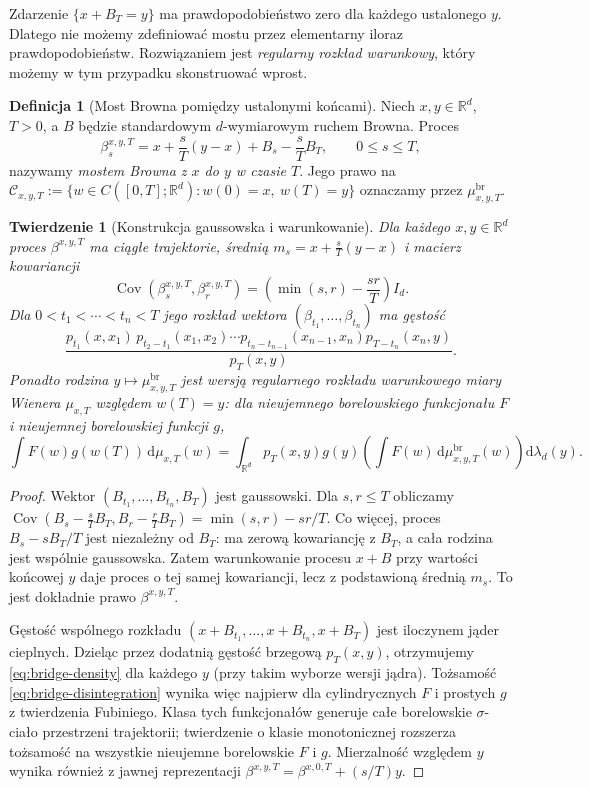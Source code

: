 \documentclass[11pt,a4paper,oneside]{report}
\numberwithin{equation}{chapter}
\theoremstyle{plain}
\newtheorem{twierdzenie}{Twierdzenie}[chapter]
\theoremstyle{definition}
\newtheorem{definicja}{Definicja}[chapter]
\theoremstyle{remark}
\newcommand{\R}{\mathbb{R}}
\newcommand{\calC}{\mathcal{C}}
\newcommand{\dd}{\mathrm{d}}
\begin{document}
Zdarzenie $\{x+B_T=y\}$ ma prawdopodobieństwo zero dla
każdego ustalonego $y$. Dlatego nie możemy zdefiniować mostu
przez elementarny iloraz prawdopodobieństw.
Rozwiązaniem jest \emph{regularny rozkład warunkowy}, który
możemy w tym przypadku skonstruować wprost.

\begin{definicja}[Most Browna pomiędzy ustalonymi końcami]
\label{def:brownian-bridge-path}
Niech $x,y\in\R^d$, $T>0$, a $B$ będzie standardowym
$d$-wymiarowym ruchem Browna. Proces
\[
 \beta_s^{x,y,T}=x+\frac{s}{T}(y-x)+B_s-\frac{s}{T}B_T,
 \qquad 0\le s\le T,
\]
nazywamy \emph{mostem Browna z $x$ do $y$ w czasie $T$}.
Jego prawo na
$\calC_{x,y,T}:=\{w\in C([0,T];\R^d):w(0)=x,\ w(T)=y\}$
oznaczamy przez $\mu_{x,y,T}^{\mathrm{br}}$.
\end{definicja}

\begin{twierdzenie}[Konstrukcja gaussowska i warunkowanie]
\label{th:bridge-conditional}
Dla każdego $x,y\in\R^d$ proces $\beta^{x,y,T}$ ma
ciągłe trajektorie, średnią
$m_s=x+\frac{s}{T}(y-x)$ i macierz kowariancji
\[
\operatorname{Cov}(\beta_s^{x,y,T},\beta_r^{x,y,T})
 =\left(\min(s,r)-\frac{sr}{T}\right)I_d.
\]
Dla $0<t_1<\cdots<t_n<T$ jego rozkład wektora
$(\beta_{t_1},\ldots,\beta_{t_n})$ ma gęstość
\[
\frac{p_{t_1}(x,x_1)\,p_{t_2-t_1}(x_1,x_2)
 \cdots p_{t_n-t_{n-1}}(x_{n-1},x_n)
 p_{T-t_n}(x_n,y)}{p_T(x,y)}.
\tag{15.1}\label{eq:bridge-density}
\]
Ponadto rodzina $y\mapsto\mu_{x,y,T}^{\mathrm{br}}$
jest wersją regularnego rozkładu warunkowego miary Wienera
$\mu_{x,T}$ względem $w(T)=y$: dla nieujemnego borelowskiego
funkcjonału $F$ i nieujemnej borelowskiej funkcji $g$,
\[
 \int F(w)g(w(T))\,\dd\mu_{x,T}(w)
 =\int_{\R^d}p_T(x,y)g(y)
    \left(\int F(w)\,\dd\mu_{x,y,T}^{\mathrm{br}}(w)\right)
    \dd\lambda_d(y).
\tag{15.2}\label{eq:bridge-disintegration}
\]
\end{twierdzenie}
\begin{proof}
Wektor $(B_{t_1},\ldots,B_{t_n},B_T)$ jest gaussowski.
Dla $s,r\le T$ obliczamy
$\operatorname{Cov}(B_s-\frac sT B_T,
B_r-\frac rT B_T)=\min(s,r)-sr/T$.
Co więcej, proces $B_s-sB_T/T$ jest niezależny od $B_T$:
ma zerową kowariancję z $B_T$, a cała rodzina jest wspólnie
gaussowska. Zatem warunkowanie procesu $x+B$ przy wartości
końcowej $y$ daje proces o tej samej kowariancji, lecz z
podstawioną średnią $m_s$. To jest dokładnie prawo
$\beta^{x,y,T}$.

Gęstość wspólnego rozkładu
$(x+B_{t_1},\ldots,x+B_{t_n},x+B_T)$ jest iloczynem
jąder cieplnych. Dzieląc przez dodatnią gęstość brzegową
$p_T(x,y)$, otrzymujemy \eqref{eq:bridge-density} dla
każdego $y$ (przy takim wyborze wersji jądra).
Tożsamość \eqref{eq:bridge-disintegration} wynika więc
najpierw dla cylindrycznych $F$ i prostych $g$ z twierdzenia
Fubiniego. Klasa tych funkcjonałów generuje całe borelowskie
$\sigma$-ciało przestrzeni trajektorii; twierdzenie o klasie
monotonicznej rozszerza tożsamość na wszystkie nieujemne
borelowskie $F$ i $g$. Mierzalność względem $y$ wynika
również z jawnej reprezentacji
$\beta^{x,y,T}=\beta^{x,0,T}+(s/T)y$.
\end{proof}
\end{document}
